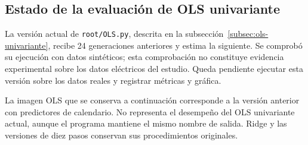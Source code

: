 \subsection{Estado de la evaluación de OLS univariante}

La versión actual de \texttt{root/OLS.py}, descrita en la subsección~\ref{subsec:ols-univariante}, recibe 24 generaciones anteriores y estima la siguiente. Se comprobó su ejecución con datos sintéticos; esta comprobación no constituye evidencia experimental sobre los datos eléctricos del estudio. Queda pendiente ejecutar esta versión sobre los datos reales y registrar métricas y gráfica.

La imagen OLS que se conserva a continuación corresponde a la versión anterior con predictores de calendario. No representa el desempeño del OLS univariante actual, aunque el programa mantiene el mismo nombre de salida. Ridge y las versiones de diez pasos conservan sus procedimientos originales.
